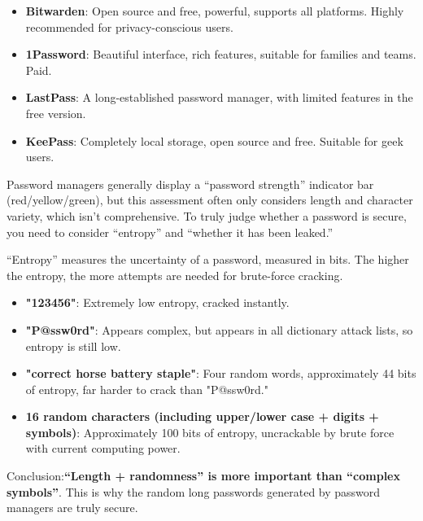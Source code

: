 
\begin{itemize}
  \item \textbf{Bitwarden}: Open source and free, powerful, supports all platforms. Highly recommended for privacy-conscious users.
  \item \textbf{1Password}: Beautiful interface, rich features, suitable for families and teams. Paid.
  \item \textbf{LastPass}: A long-established password manager, with limited features in the free version.
  \item \textbf{KeePass}: Completely local storage, open source and free. Suitable for geek users.
\end{itemize}


Password managers generally display a “password strength” indicator bar (red/yellow/green), but this assessment often only considers length and character variety, which isn't comprehensive. To truly judge whether a password is secure, you need to consider “entropy” and “whether it has been leaked.”


“Entropy” measures the uncertainty of a password, measured in bits. The higher the entropy, the more attempts are needed for brute-force cracking.

\begin{itemize}
  \item \textbf{"123456"}: Extremely low entropy, cracked instantly.
  \item \textbf{"P@ssw0rd"}: Appears complex, but appears in all dictionary attack lists, so entropy is still low.
  \item \textbf{"correct horse battery staple"}: Four random words, approximately 44 bits of entropy, far harder to crack than "P@ssw0rd."
  \item \textbf{16 random characters (including upper/lower case + digits + symbols)}: Approximately 100 bits of entropy, uncrackable by brute force with current computing power.
\end{itemize}

Conclusion:\textbf{“Length + randomness” is more important than “complex symbols”}. This is why the random long passwords generated by password managers are truly secure.


